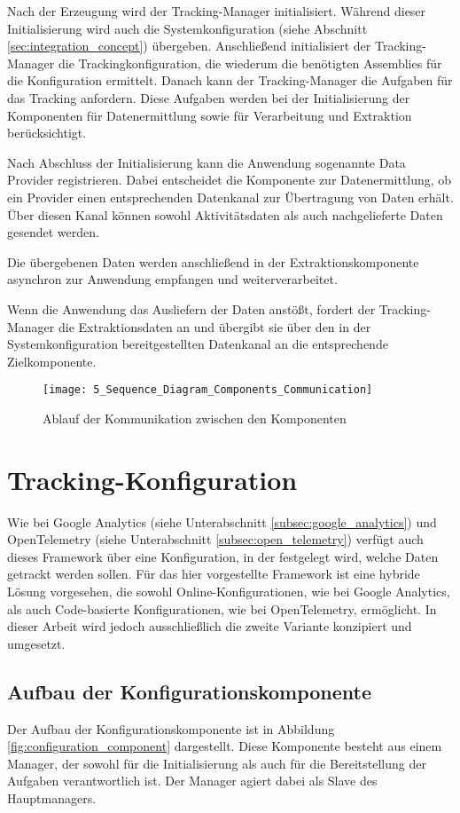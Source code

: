 Nach der Erzeugung wird der Tracking-Manager initialisiert. Während dieser Initialisierung wird auch die Systemkonfiguration (siehe Abschnitt \ref{sec:integration_concept}) übergeben. Anschließend initialisiert der Tracking-Manager die Trackingkonfiguration, die wiederum die benötigten Assemblies für die Konfiguration ermittelt. Danach kann der Tracking-Manager die Aufgaben für das Tracking anfordern. Diese Aufgaben werden bei der Initialisierung der Komponenten für Datenermittlung sowie für Verarbeitung und Extraktion berücksichtigt.

Nach Abschluss der Initialisierung kann die Anwendung sogenannte Data Provider registrieren. Dabei entscheidet die Komponente zur Datenermittlung, ob ein Provider einen entsprechenden Datenkanal zur Übertragung von Daten erhält. Über diesen Kanal können sowohl Aktivitätsdaten als auch nachgelieferte Daten gesendet werden.

Die übergebenen Daten werden anschließend in der Extraktionskomponente asynchron zur Anwendung empfangen und weiterverarbeitet.  

Wenn die Anwendung das Ausliefern der Daten anstößt, fordert der Tracking-Manager die Extraktionsdaten an und übergibt sie über den in der Systemkonfiguration bereitgestellten Datenkanal an die entsprechende Zielkomponente.

\begin{figure}[H]
    \centering
    \texttt{[image: 5\_Sequence\_Diagram\_Components\_Communication]}
    \caption{Ablauf der Kommunikation zwischen den Komponenten}
    \label{fig:sequence_diagram_communication_components}
\end{figure}

\section{Tracking-Konfiguration}
\label{sec:configuration_concept}
Wie bei Google Analytics (siehe Unterabschnitt \ref{subsec:google_analytics}) und OpenTelemetry (siehe Unterabschnitt \ref{subsec:open_telemetry}) verfügt auch dieses Framework über eine Konfiguration, in der festgelegt wird, welche Daten getrackt werden sollen. Für das hier vorgestellte Framework ist eine hybride Lösung vorgesehen, die sowohl Online-Konfigurationen, wie bei Google Analytics, als auch Code-basierte Konfigurationen, wie bei OpenTelemetry, ermöglicht. In dieser Arbeit wird jedoch ausschließlich die zweite Variante konzipiert und umgesetzt.

\subsection{Aufbau der Konfigurationskomponente}
Der Aufbau der Konfigurationskomponente ist in Abbildung \ref{fig:configuration_component} dargestellt. Diese Komponente besteht aus einem Manager, der sowohl für die Initialisierung als auch für die Bereitstellung der Aufgaben verantwortlich ist. Der Manager agiert dabei als Slave des Hauptmanagers.

